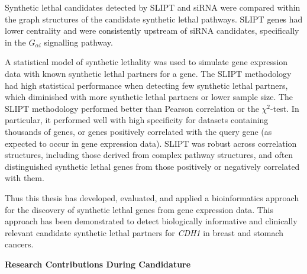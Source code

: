 Synthetic lethal candidates detected by \acrshort{SLIPT} and \acrshort{siRNA} were compared within the graph structures of the candidate synthetic lethal pathways.
\textcolor{black}{SLIPT genes} had lower centrality and were \textcolor{black}{consistently} upstream of \acrshort{siRNA} candidates, specifically in the $G_{\alpha i}$ signalling pathway.

A statistical model of synthetic lethality was used to simulate gene expression data with known synthetic lethal partners for a gene. The \acrshort{SLIPT} methodology had high statistical performance when detecting few synthetic lethal partners, which diminished with more synthetic lethal partners or lower sample size. The \acrshort{SLIPT} methodology performed better than Pearson correlation or the $\chi^2$-test. In particular, it performed well with high specificity for datasets containing thousands of genes, or genes positively correlated with the query gene (as expected to occur in gene expression data). \acrshort{SLIPT} was robust across correlation structures, including those derived from complex pathway structures, and often distinguished synthetic lethal genes from those positively or negatively correlated with them. %


Thus this thesis has developed, evaluated, and applied a bioinformatics approach for the discovery of synthetic lethal genes from gene expression data. This approach has been demonstrated to detect biologically informative and clinically relevant candidate synthetic lethal partners for \textit{CDH1} in breast and stomach cancers. %

\iffalse
\clearpage

\begin{center}
 \textbf{Research Contributions During Candidature}
\end{center}

